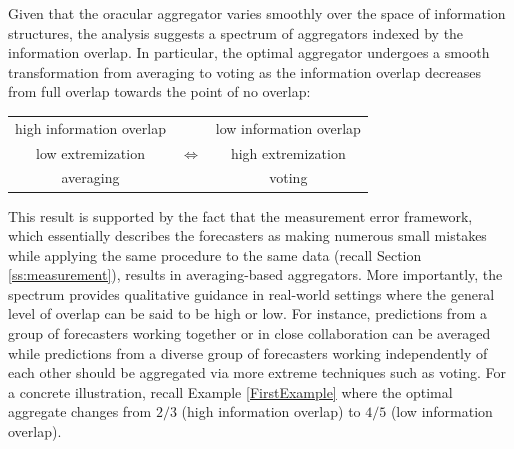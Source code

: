 \documentclass[12pt]{article}
\theoremstyle{definition}
\theoremstyle{definition}
\begin{document}
Given that the oracular aggregator varies
smoothly over the space of information structures, the analysis suggests a spectrum of aggregators indexed by
the information overlap.
In particular, the optimal aggregator undergoes a smooth
transformation from averaging to voting as
the information overlap decreases from full overlap towards the point
of no overlap:
\begin{center}
\singlespacing
\vspace{-1em}
\begin{tabular}{ccc}
high information overlap & & low information overlap\\
low extremization & {\Large $\Longleftrightarrow$} & high extremization \\
averaging  & & voting
\end{tabular}
\end{center}
This result is supported by the fact that the
measurement error framework, which essentially describes the
forecasters as making numerous small mistakes while applying the same
procedure to the same data (recall Section \ref{ss:measurement}),
results in averaging-based aggregators.
More importantly, the spectrum provides qualitative guidance in real-world settings
where the general level of overlap can be said to be high or low.  For
instance, predictions from a group of forecasters working together or in
close collaboration can be averaged while predictions from a diverse
group of forecasters working independently of each other should be
aggregated via more extreme techniques such as voting. For a concrete illustration, recall  Example \ref{FirstExample} where the optimal aggregate changes from $2/3$ (high information overlap) to $4/5$ (low information overlap). 

\end{document}
